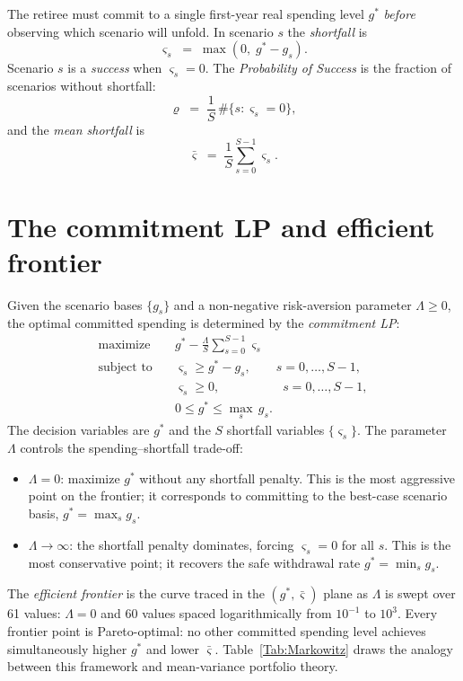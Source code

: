\documentclass[fleqn,12pt]{report}
\begin{document}
The retiree must commit to a single first-year real spending level $g^*$
\textit{before} observing which scenario will unfold.
In scenario $s$ the \textit{shortfall} is
\begin{equation}
    \label{Eq:Shortfall}
    \varsigma_s \;=\; \max(0,\; g^* - g_s).
\end{equation}
Scenario $s$ is a \textit{success} when $\varsigma_s = 0$.
The \textit{Probability of Success} is the fraction of scenarios without shortfall:
\begin{equation}
    \label{Eq:PoS}
    \varrho \;=\; \frac{1}{S}\,\#\bigl\{s : \varsigma_s = 0\bigr\},
\end{equation}
and the \textit{mean shortfall} is
\begin{equation}
    \label{Eq:MeanShortfall}
    \bar\varsigma \;=\; \frac{1}{S}\sum_{s=0}^{S-1} \varsigma_s.
\end{equation}

\section{The commitment LP and efficient frontier}

Given the scenario bases $\{g_s\}$ and a non-negative risk-aversion parameter
$\Lambda \geq 0$, the optimal committed spending is determined by the
\textit{commitment LP}:
\begin{equation}
    \label{Eq:CommitmentLP}
    \begin{aligned}
        \text{maximize}   &\quad g^* - \frac{\Lambda}{S}\sum_{s=0}^{S-1} \varsigma_s \\
        \text{subject to} &\quad \varsigma_s \geq g^* - g_s, \qquad s=0,\ldots,S-1, \\
                          &\quad \varsigma_s \geq 0, \qquad\qquad\quad s=0,\ldots,S-1, \\
                          &\quad 0 \leq g^* \leq \max_{s}\, g_s.
    \end{aligned}
\end{equation}
The decision variables are $g^*$ and the $S$ shortfall variables $\{\varsigma_s\}$.
The parameter $\Lambda$ controls the spending--shortfall trade-off:
\begin{itemize}[nosep]
    \item $\Lambda = 0$: maximize $g^*$ without any shortfall penalty.
          This is the most aggressive point on the frontier; it corresponds to
          committing to the best-case scenario basis, $g^* = \max_s g_s$.
    \item $\Lambda \to \infty$: the shortfall penalty dominates, forcing
          $\varsigma_s = 0$ for all $s$.
          This is the most conservative point; it recovers the safe withdrawal
          rate $g^* = \min_s g_s$.
\end{itemize}
The \textit{efficient frontier} is the curve traced in the $(g^*, \bar\varsigma)$
plane as $\Lambda$ is swept over 61 values: $\Lambda = 0$ and 60 values spaced
logarithmically from $10^{-1}$ to $10^3$.
Every frontier point is Pareto-optimal: no other committed spending level achieves
simultaneously higher $g^*$ and lower $\bar\varsigma$.
Table~\ref{Tab:Markowitz} draws the analogy between this framework and
mean-variance portfolio theory.
\end{document}
